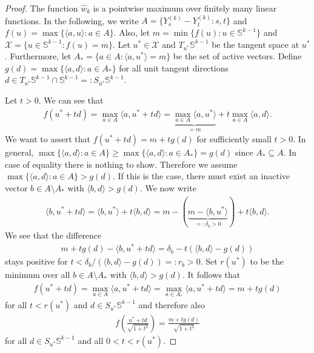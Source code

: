 \begin{proof}
    The function $\hat{w}_k$ is a pointwise maximum over finitely many linear functions. In the following, we write $A=\{Y_s^{(k)}-Y_t^{(k)}:s,t\}$ and $f(u)=\max\{\langle a,u\rangle:a\in A\}$. Also, let $m=\min\{f(u):u\in\mathbb{S}^{k-1}\}$ and $\mathcal{X}=\{u\in\mathbb{S}^{k-1}:f(u)=m\}$. Let $u^{\ast}\in\mathcal{X}$ and $T_{u^{\ast}}\mathbb{S}^{k-1}$ be the tangent space at $u^{\ast}$. Furthermore, let $A_{\ast}=\{a\in A:\langle a,u^{\ast}\rangle=m\}$ be the set of active vectors. Define $g(d)=\max\{\langle a,d\rangle:a\in A_{\ast}\}$ for all unit tangent directions $d\in T_{u^{\ast}}\mathbb{S}^{k-1}\cap\mathbb{S}^{k-1}=:S_{u^{\ast}}\mathbb{S}^{k-1}$.

    Let $t>0$. We can see that
    \begin{align*}
        f\left(u^{\ast}+td\right)=\max_{a\in A}\langle a,u^{\ast}+td\rangle=\underbrace{\max_{a\in A}\langle a,u^{\ast}\rangle}_{=m}+t\max_{a\in A}\langle a,d\rangle.
    \end{align*}
    We want to assert that $f(u^{\ast}+td)=m+tg(d)$ for sufficiently small $t>0$. In general, $\max\{\langle a,d\rangle:a\in A\}\ge\max\{\langle a,d\rangle:a\in A_{\ast}\}=g(d)$ since $A_{\ast}\subseteq A$. In case of equality there is nothing to show. Therefore we assume $\max\{\langle a,d\rangle:a\in A\}>g(d)$. If this is the case, there must exist an inactive vector $b\in A\setminus A_{\ast}$ with $\langle b,d\rangle>g(d)$. We now write
    \begin{align*}
        \langle b,u^{\ast}+td\rangle=\langle b,u^{\ast}\rangle+t\langle b,d\rangle=m-(\underbrace{m-\langle b,u^{\ast}\rangle}_{=:\delta_b>0})+t\langle b,d\rangle.
    \end{align*}
    We see that the difference
    \begin{align*}
        m+tg(d)-\langle b,u^{\ast}+td\rangle=\delta_b-t\left(\langle b,d\rangle-g(d)\right)
    \end{align*}
    stays positive for $t<\delta_b/(\langle b,d\rangle-g(d))=:r_b>0$. Set $r(u^{\ast})$ to be the minimum over all $b\in A\setminus A_{\ast}$ with $\langle b,d\rangle>g(d)$. It follows that
    \begin{align*}
        f(u^{\ast}+td)=\max_{a\in A}\langle a,u^{\ast}+td\rangle=\max_{a\in A_{\ast}}\langle a,u^{\ast}+td\rangle=m+tg(d)
    \end{align*}
    for all $t<r(u^{\ast})$ and $d\in S_{u^{\ast}}\mathbb{S}^{k-1}$ and therefore also
    \begin{align}\label{eq:proof_weak_sharp_minima_lemma01}
        f\left(\frac{u^{\ast}+td}{\sqrt{1+t^2}}\right)=\frac{m+tg(d)}{\sqrt{1+t^2}}
    \end{align}
    for all $d\in S_{u^{\ast}}\mathbb{S}^{k-1}$ and all $0<t<r(u^{\ast})$.


\end{proof}
